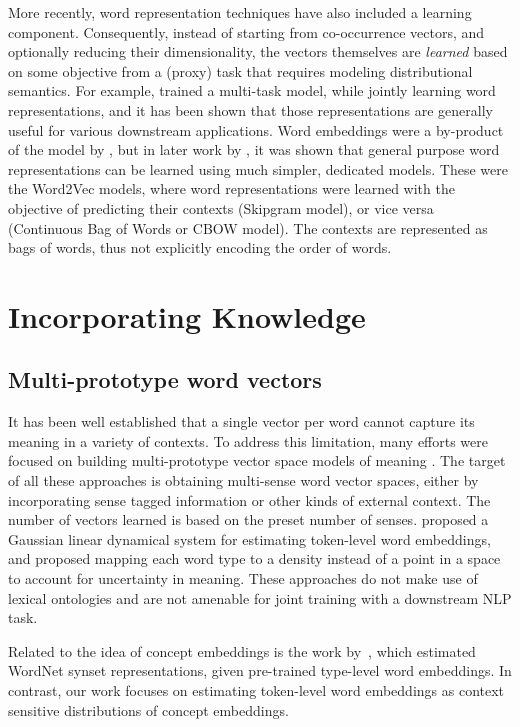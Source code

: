 More recently, word representation techniques have also included a learning component. Consequently, instead of
starting from co-occurrence vectors, and optionally reducing their dimensionality, the vectors themselves are
\textit{learned} based on some objective from a (proxy) task that requires modeling distributional semantics. For example,
\cite{collobert2008unified} trained a multi-task model, while jointly learning word representations, and it has
been shown that those representations are generally useful for various downstream applications. Word embeddings
were a by-product of the model by \cite{collobert2008unified}, but in later work by \cite{mikolov2013efficient},
it was shown that general purpose word representations can be learned using much simpler, dedicated models.
These were the Word2Vec models, where word representations were learned with the objective of predicting their
contexts (Skipgram model), or vice versa (Continuous Bag of Words or CBOW model). The contexts are represented as
bags of words, thus not explicitly encoding the order of words.

\section{Incorporating Knowledge}
\subsection{Multi-prototype word vectors}
It has been well established that a single vector per word cannot capture its meaning in a variety of contexts.
To address this limitation, many efforts were focused on building multi-prototype vector space models of meaning
\cite[][etc.]{reisinger2010multi,huang2012improving,chen2014unified,jauhar:15,neelakantan2015efficient,arora2016linear}.
The target of all these approaches is obtaining multi-sense word vector spaces, either by incorporating
sense tagged information or other kinds of external context. The number of vectors learned is based on
the preset number of senses. \cite{belanger:15} proposed a Gaussian linear dynamical system for estimating token-level
word embeddings, and \cite{Vilnis2014WordRV} proposed mapping each word type to a density instead of a
point in a space to account for uncertainty in meaning. These approaches do not make use of lexical ontologies and
are not amenable for joint training with a downstream NLP task. 

Related to the idea of concept embeddings is the work by~\cite{rothe:15}, which estimated WordNet synset
representations, given pre-trained type-level word embeddings.
In contrast, our work focuses on estimating token-level word embeddings as context sensitive distributions of
concept embeddings.

